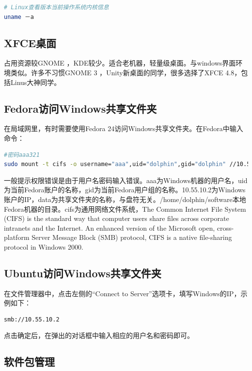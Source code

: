 \documentclass[letter]{book}
\begin{document}
\begin{lstlisting}[language=Bash]
# Linux查看版本当前操作系统内核信息
uname －a 
\end{lstlisting}

\subsection{XFCE桌面}

占用资源较GNOME ，KDE较少。适合老机器，轻量级桌面。与windows界面环境类似。许多不习惯GNOME 3 ，Unity新桌面的同学，很多选择了XFCE 4.8，包括Linus大神同学。

\subsection{Fedora访问Windows共享文件夹}

在局域网里，有时需要使用Fedora 24访问Windows共享文件夹。在Fedora中输入命令：

\begin{lstlisting}[language=Bash]
#密码aaa321
sudo mount -t cifs -o username="aaa",uid="dolphin",gid="dolphin" //10.55.10.2/data /home/dolphin/software
\end{lstlisting}

一般提示权限错误是由于用户名密码输入错误。aaa为Windows机器的用户名，uid为当前Fedora账户的名称，gid为当前Fedora用户组的名称。10.55.10.2为Windows账户的IP，data为共享文件夹的名称，与盘符无关。/home/dolphin/software本地Fedora机器的目录。cifs为通用网络文件系统，The Common Internet File System (CIFS) is the standard way that computer users share files across corporate intranets and the Internet. An enhanced version of the Microsoft open, cross-platform Server Message Block (SMB) protocol, CIFS is a native file-sharing protocol in Windows 2000.

\subsection{Ubuntu访问Windows共享文件夹}

在文件管理器中，点击左侧的“Connect to Server”选项卡，填写Windows的IP，示例如下：

\begin{lstlisting}[language=HTML]
smb://10.55.10.2
\end{lstlisting}

点击确定后，在弹出的对话框中输入相应的用户名和密码即可。

\subsection{软件包管理}
\end{document}
